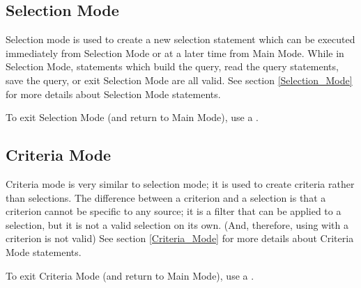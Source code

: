 \subsection{Selection Mode}

Selection mode is used to create a new selection statement which can be executed immediately from Selection Mode or at a later time from Main Mode.
While in Selection Mode, statements which build the query, read the query statements, save the query, or exit
Selection Mode are all valid. See section \ref{Selection_Mode} for more details about Selection Mode statements.

To exit Selection Mode (and return to Main Mode), use a .

\subsection{Criteria Mode}
Criteria mode is very similar to selection mode; it is used to create criteria rather than selections.
The difference between a criterion and a selection is that a criterion cannot be specific to any source;
it is a filter that can be applied to a selection, but it is not a valid selection on its own. (And, therefore, using  with a criterion is not valid)
See section \ref{Criteria_Mode} for more details about Criteria Mode statements.

To exit Criteria Mode (and return to Main Mode), use a .
